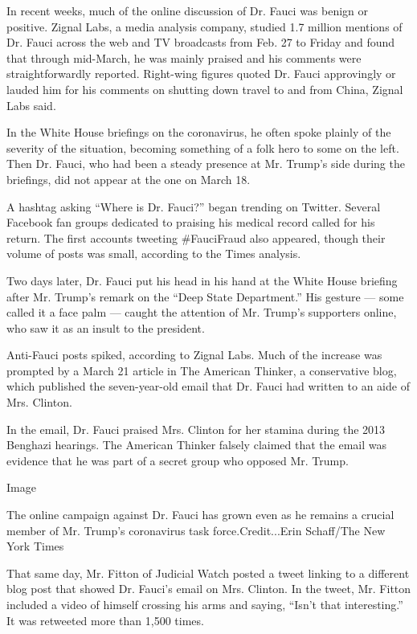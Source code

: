 In recent weeks, much of the online discussion of Dr. Fauci was benign
or positive. Zignal Labs, a media analysis company, studied 1.7 million
mentions of Dr. Fauci across the web and TV broadcasts from Feb. 27 to
Friday and found that through mid-March, he was mainly praised and his
comments were straightforwardly reported. Right-wing figures quoted Dr.
Fauci approvingly or lauded him for his comments on shutting down travel
to and from China, Zignal Labs said.

In the White House briefings on the coronavirus, he often spoke plainly
of the severity of the situation, becoming something of a folk hero to
some on the left. Then Dr. Fauci, who had been a steady presence at Mr.
Trump's side during the briefings, did not appear at the one on March
18.

A hashtag asking ``Where is Dr. Fauci?'' began trending on Twitter.
Several Facebook fan groups dedicated to praising his medical record
called for his return. The first accounts tweeting \#FauciFraud also
appeared, though their volume of posts was small, according to the Times
analysis.

Two days later, Dr. Fauci put his head in his hand at the White House
briefing after Mr. Trump's remark on the ``Deep State Department.'' His
gesture --- some called it a face palm --- caught the attention of Mr.
Trump's supporters online, who saw it as an insult to the president.

Anti-Fauci posts spiked, according to Zignal Labs. Much of the increase
was prompted by a March 21 article in The American Thinker, a
conservative blog, which published the seven-year-old email that Dr.
Fauci had written to an aide of Mrs. Clinton.

In the email, Dr. Fauci praised Mrs. Clinton for her stamina during the
2013 Benghazi hearings. The American Thinker falsely claimed that the
email was evidence that he was part of a secret group who opposed Mr.
Trump.

Image

The online campaign against Dr. Fauci has grown even as he remains a
crucial member of Mr. Trump's coronavirus task force.Credit...Erin
Schaff/The New York Times

That same day, Mr. Fitton of Judicial Watch posted a tweet linking to a
different blog post that showed Dr. Fauci's email on Mrs. Clinton. In
the tweet, Mr. Fitton included a video of himself crossing his arms and
saying, ``Isn't that interesting.'' It was retweeted more than 1,500
times.


